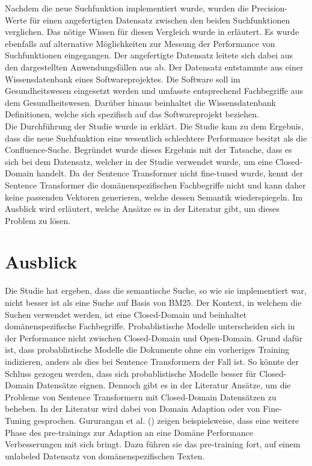 Nachdem die neue Suchfunktion implementiert wurde, wurden die Precision-Werte für einen angefertigten Datensatz zwischen den beiden Suchfunktionen verglichen.
Das nötige Wissen für diesen Vergleich wurde in  erläutert.
Es wurde ebenfalls auf alternative Möglichkeiten zur Messung der Performance von Suchfunktionen eingegangen.
Der angefertigte Datensatz leitete sich dabei aus den dargestellten Anwendungsfällen aus  ab.
Der Datensatz entstammte aus einer Wissensdatenbank eines Softwareprojektes.
Die Software soll im Gesundheitswesen eingesetzt werden und umfasste entsprechend Fachbegriffe aus dem Gesundheitswesen.
Darüber hinaus beinhaltet die Wissensdatenbank Definitionen, welche sich spezifisch auf das Softwareprojekt beziehen.\\

Die Durchführung der Studie wurde in  erklärt.
Die Studie kam zu dem Ergebnis, dass die neue Suchfunktion eine wesentlich schlechtere Performance besitzt als die Confluence-Suche.
Begründet wurde dieses Ergebnis mit der Tatsache, dass es sich bei dem Datensatz, welcher in der Studie verwendet wurde, um eine Closed-Domain handelt.
Da der Sentence Transformer nicht fine-tuned wurde, kennt der Sentence Transformer die domänenspezifischen Fachbegriffe nicht und kann daher keine passenden Vektoren generieren, welche dessen Semantik wiederspiegeln.
Im Ausblick wird erläutert, welche Ansätze es in der Literatur gibt, um dieses Problem zu lösen.

\section{Ausblick}
\label{chap:ausblick}
Die Studie hat ergeben, dass die semantische Suche, so wie sie implementiert war, nicht besser ist als eine Suche auf Basis von BM25.
Der Kontext, in welchem die Suchen verwendet werden, ist eine Closed-Domain und beinhaltet domänenspezifische Fachbegriffe.
Probablistische Modelle unterscheiden sich in der Performance nicht zwischen Closed-Domain und Open-Domain.
Grund dafür ist, dass probablistische Modelle die Dokumente ohne ein vorheriges Training indizieren, anders als dies bei Sentence Transformern der Fall ist. 
So könnte der Schluss gezogen werden, dass sich probablistische Modelle besser für Closed-Domain Datensätze eignen.
Dennoch gibt es in der Literatur Ansätze, um die Probleme von Sentence Transformern mit Closed-Domain Datensätzen zu beheben.
In der Literatur wird dabei von Domain Adaption oder von Fine-Tuning gesprochen.
Gururangan et al. (\citeyear{Gururangan_Marasović_Swayamdipta_Lo_Beltagy_Downey_Smith_2020}) zeigen beispielsweise, dass eine weitere Phase des pre-trainings zur Adaption an eine Domäne Performance Verbesserungen mit sich bringt.
Dazu führen sie das pre-training fort, auf einem unlabeled Datensatz von domänenspezifischen Texten.\\


